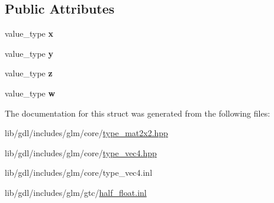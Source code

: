 \subsection*{Public Attributes}
\begin{DoxyCompactItemize}
\item 
\hypertarget{structglm_1_1detail_1_1tvec4_ac96d73b115aec6f701b54cd602beb61f}{}value\+\_\+type {\bfseries x}\label{structglm_1_1detail_1_1tvec4_ac96d73b115aec6f701b54cd602beb61f}

\item 
\hypertarget{structglm_1_1detail_1_1tvec4_a505c36f3d9beec3fd7ca445edeab8c68}{}value\+\_\+type {\bfseries y}\label{structglm_1_1detail_1_1tvec4_a505c36f3d9beec3fd7ca445edeab8c68}

\item 
\hypertarget{structglm_1_1detail_1_1tvec4_a63b99f92f63bef7b4f555c596f547ba9}{}value\+\_\+type {\bfseries z}\label{structglm_1_1detail_1_1tvec4_a63b99f92f63bef7b4f555c596f547ba9}

\item 
\hypertarget{structglm_1_1detail_1_1tvec4_a0759575c2d612ffbf91e6e07d484a09d}{}value\+\_\+type {\bfseries w}\label{structglm_1_1detail_1_1tvec4_a0759575c2d612ffbf91e6e07d484a09d}

\end{DoxyCompactItemize}


The documentation for this struct was generated from the following files\+:\begin{DoxyCompactItemize}
\item 
lib/gdl/includes/glm/core/\hyperlink{type__mat2x2_8hpp}{type\+\_\+mat2x2.\+hpp}\item 
lib/gdl/includes/glm/core/\hyperlink{type__vec4_8hpp}{type\+\_\+vec4.\+hpp}\item 
lib/gdl/includes/glm/core/type\+\_\+vec4.\+inl\item 
lib/gdl/includes/glm/gtc/\hyperlink{half__float_8inl}{half\+\_\+float.\+inl}\end{DoxyCompactItemize}
